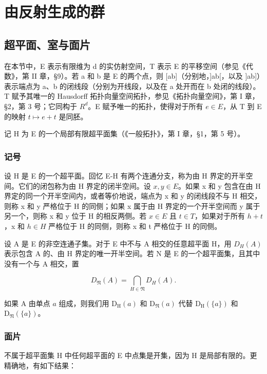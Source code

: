 \chapter{由反射生成的群}

\section{超平面、室与面片}

在本节中，E 表示有限维为 d 的实仿射空间，T 表示 E 的平移空间（参见《代数》，第 II 章，§9）。若 a 和 b 是 E 的两个点，则 {[}ab{]}（分别地，{]}ab{[}，以及 {]}ab{]}）表示端点为 a、b 的闭线段（分别为开线段，以及在 a 处开而在 b 处闭的线段）。T 赋予其唯一的 Hausdorff 拓扑向量空间拓扑，参见《拓扑向量空间》，第 I 章，§2，第 3 号；它同构于 \(R^{d}\)。E 赋予唯一的拓扑，使得对于所有 \(e \in E\)，从 T 到 E 的映射 \(t \mapsto e + t\) 是同胚。

记 H 为 E 的一个局部有限超平面集（《一般拓扑》，第 I 章，§1，第 5 号）。

\subsection{记号}

设 H 是 E 的一个超平面。回忆 E-H 有两个连通分支，称为由 H 界定的开半空间。它们的闭包称为由 H 界定的闭半空间。设 \(x, y \in E\)。如果 x 和 y 包含在由 H 界定的同一个开半空间内，或者等价地说，端点为 x 和 y 的闭线段不与 H 相交，则称 x 和 y 严格位于 H 的同侧；如果 x 属于由 H 界定的一个开半空间而 y 属于另一个，则称 x 和 y 位于 H 的相反两侧。若 \(x \in E\) 且 \(t \in T\)，如果对于所有 \(h + t\)，x 和 \(h \in H\) 严格位于 H 的同侧，则称 x 和 t 严格位于 H 的同侧。

设 A 是 E 的非空连通子集。对于 E 中不与 A 相交的任意超平面 H，用 \(D_{H}(A)\) 表示包含 A 的、由 H 界定的唯一开半空间。若 N 是 E 的一个超平面集，且其中没有一个与 A 相交，置

\[
D _ {\mathfrak {N}} (A) = \bigcap_ {H \in \mathfrak {N}} D _ {H} (A).\tag{1}
\]

如果 \(\mathrm{A}\) 由单点 \(a\) 组成，则我们用 \(\mathrm{D_H}(a)\) 和 \(\mathrm{D}_{\mathfrak{N}}(a)\) 代替 \(\mathrm{D_H}(\{a\})\) 和 \(\mathrm{D}_{\mathfrak{N}}(\{a\})\)。

\subsection{面片}

不属于超平面集 H 中任何超平面的 E 中点集是开集，因为 H 是局部有限的。更精确地，有如下结果：

